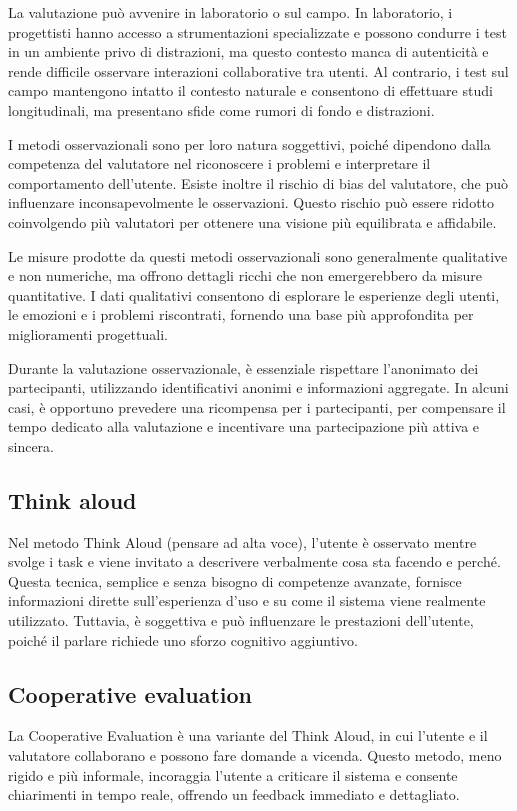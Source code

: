 La valutazione può avvenire in laboratorio o sul campo. In laboratorio, i progettisti hanno accesso a strumentazioni specializzate e possono condurre i test in un ambiente privo di distrazioni, ma questo contesto manca di autenticità e rende difficile osservare interazioni collaborative tra utenti. Al contrario, i test sul campo mantengono intatto il contesto naturale e consentono di effettuare studi longitudinali, ma presentano sfide come rumori di fondo e distrazioni.

I metodi osservazionali sono per loro natura soggettivi, poiché dipendono dalla competenza del valutatore nel riconoscere i problemi e interpretare il comportamento dell'utente. Esiste inoltre il rischio di bias del valutatore, che può influenzare inconsapevolmente le osservazioni. Questo rischio può essere ridotto coinvolgendo più valutatori per ottenere una visione più equilibrata e affidabile.

Le misure prodotte da questi metodi osservazionali sono generalmente qualitative e non numeriche, ma offrono dettagli ricchi che non emergerebbero da misure quantitative. I dati qualitativi consentono di esplorare le esperienze degli utenti, le emozioni e i problemi riscontrati, fornendo una base più approfondita per miglioramenti progettuali.

Durante la valutazione osservazionale, è essenziale rispettare l'anonimato dei partecipanti, utilizzando identificativi anonimi e informazioni aggregate. In alcuni casi, è opportuno prevedere una ricompensa per i partecipanti, per compensare il tempo dedicato alla valutazione e incentivare una partecipazione più attiva e sincera.

\subsection{Think aloud}
Nel metodo Think Aloud (pensare ad alta voce), l’utente è osservato mentre svolge i task e viene invitato a descrivere verbalmente cosa sta facendo e perché. Questa tecnica, semplice e senza bisogno di competenze avanzate, fornisce informazioni dirette sull’esperienza d’uso e su come il sistema viene realmente utilizzato. Tuttavia, è soggettiva e può influenzare le prestazioni dell’utente, poiché il parlare richiede uno sforzo cognitivo aggiuntivo.

\subsection{Cooperative evaluation}
La Cooperative Evaluation è una variante del Think Aloud, in cui l'utente e il valutatore collaborano e possono fare domande a vicenda. Questo metodo, meno rigido e più informale, incoraggia l'utente a criticare il sistema e consente chiarimenti in tempo reale, offrendo un feedback immediato e dettagliato.

